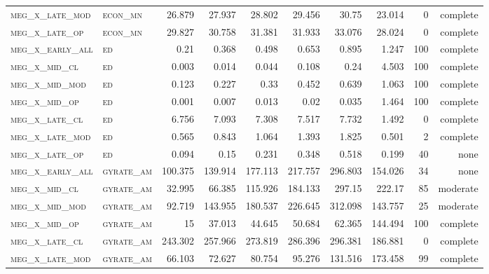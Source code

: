 \begin{landscape}
\begin{center}
\begin{footnotesize}
\begin{longtable}{llrrrrr|rrr}
\textsc{meg\_x\_late\_mod } & \textsc{econ\_mn  }    & 26.879   & 27.937   & 28.802   & 29.456   & 30.75    & 23.014   & 0   & complete \\
\textsc{meg\_x\_late\_op  } & \textsc{econ\_mn  }    & 29.827   & 30.758   & 31.381   & 31.933   & 33.076   & 28.024   & 0   & complete \\
\textsc{meg\_x\_early\_all} & \textsc{ed        }    & 0.21     & 0.368    & 0.498    & 0.653    & 0.895    & 1.247    & 100 & complete \\
\textsc{meg\_x\_mid\_cl   } & \textsc{ed        }    & 0.003    & 0.014    & 0.044    & 0.108    & 0.24     & 4.503    & 100 & complete \\
\textsc{meg\_x\_mid\_mod  } & \textsc{ed        }    & 0.123    & 0.227    & 0.33     & 0.452    & 0.639    & 1.063    & 100 & complete \\
\textsc{meg\_x\_mid\_op   } & \textsc{ed        }    & 0.001    & 0.007    & 0.013    & 0.02     & 0.035    & 1.464    & 100 & complete \\
\textsc{meg\_x\_late\_cl  } & \textsc{ed        }    & 6.756    & 7.093    & 7.308    & 7.517    & 7.732    & 1.492    & 0   & complete \\
\textsc{meg\_x\_late\_mod } & \textsc{ed        }    & 0.565    & 0.843    & 1.064    & 1.393    & 1.825    & 0.501    & 2   & complete \\
\textsc{meg\_x\_late\_op  } & \textsc{ed        }    & 0.094    & 0.15     & 0.231    & 0.348    & 0.518    & 0.199    & 40  & none     \\
\textsc{meg\_x\_early\_all} & \textsc{gyrate\_am}    & 100.375  & 139.914  & 177.113  & 217.757  & 296.803  & 154.026  & 34  & none     \\
\textsc{meg\_x\_mid\_cl   } & \textsc{gyrate\_am}    & 32.995   & 66.385   & 115.926  & 184.133  & 297.15   & 222.17   & 85  & moderate \\
\textsc{meg\_x\_mid\_mod  } & \textsc{gyrate\_am}    & 92.719   & 143.955  & 180.537  & 226.645  & 312.098  & 143.757  & 25  & moderate \\
\textsc{meg\_x\_mid\_op   } & \textsc{gyrate\_am}    & 15       & 37.013   & 44.645   & 50.684   & 62.365   & 144.494  & 100 & complete \\
\textsc{meg\_x\_late\_cl  } & \textsc{gyrate\_am}    & 243.302  & 257.966  & 273.819  & 286.396  & 296.381  & 186.881  & 0   & complete \\
\textsc{meg\_x\_late\_mod } & \textsc{gyrate\_am}    & 66.103   & 72.627   & 80.754   & 95.276   & 131.516  & 173.458  & 99  & complete \\

\end{longtable}
\end{footnotesize}
\end{center}
\end{landscape}
